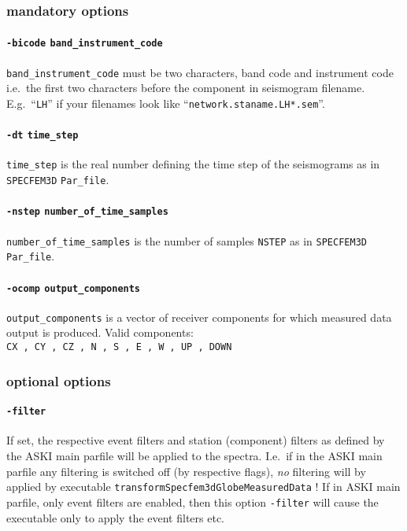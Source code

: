 \documentclass[12pt,a4paper]{article}
\newcommand{\lcode}[1]{\nolinkurl{#1}}
\newcommand{\ASKI}{ {\ttfamily ASKI} }
\begin{document}
\subsubsection*{mandatory options}
\paragraph{\lcode{-bicode} \lcode{band_instrument_code}}
\lcode{band_instrument_code} must be two characters, band code and instrument code
i.e.\ the first two characters before the component in seismogram filename.
E.g.\ ``\lcode{LH}'' if your filenames look like ``\lcode{network.staname.LH*.sem}''.
\paragraph{\lcode{-dt} \lcode{time_step}}
\lcode{time_step} is the real number defining the time step of the seismograms as in \lcode{SPECFEM3D} \lcode{Par_file}.
\paragraph{\lcode{-nstep} \lcode{number_of_time_samples}}
\lcode{number_of_time_samples} is the number of samples \lcode{NSTEP} as in \lcode{SPECFEM3D} \lcode{Par_file}.
\paragraph{\lcode{-ocomp} \lcode{output_components}}
\lcode{output_components} is a vector of receiver components for which measured data output is produced.
Valid components:\\
\lcode{CX , CY , CZ , N , S , E , W , UP , DOWN}
\subsubsection*{optional options}
\paragraph{\lcode{-filter}}
If set, the respective event filters and station (component) filters as defined by the \ASKI main parfile will 
be applied to the spectra. I.e.\, if in the \ASKI main parfile any filtering is switched off (by respective flags), 
\emph{no} filtering will by applied by executable \lcode{transformSpecfem3dGlobeMeasuredData} ! If in \ASKI
main parfile, only event filters are enabled, then this option \lcode{-filter} will cause the executable only
to apply the event filters etc.
\end{document}
